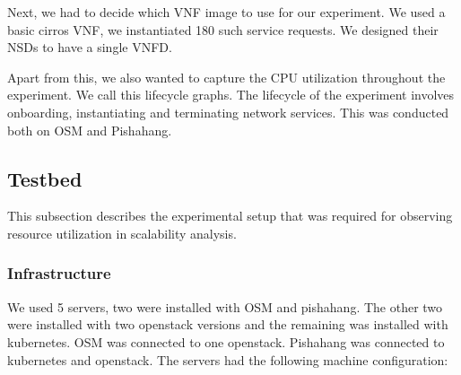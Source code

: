 Next, we had to decide which VNF image to use for our experiment. We used a basic cirros VNF, we instantiated 180 such service requests. We designed their NSDs to have a single VNFD. 

Apart from this, we also wanted to capture the CPU utilization throughout the experiment. We call this lifecycle graphs. The lifecycle of the experiment involves onboarding, instantiating and terminating network services. This was conducted both on OSM and Pishahang.  


\subsection{Testbed}

This subsection describes the experimental setup that was required for observing resource utilization in scalability analysis.
\subsubsection{Infrastructure}

We used 5 servers, two were installed with OSM and pishahang. The other two were installed with two openstack versions and the remaining was installed with kubernetes. OSM was connected to one openstack. Pishahang was connected to kubernetes and openstack. The servers had the following machine configuration:

